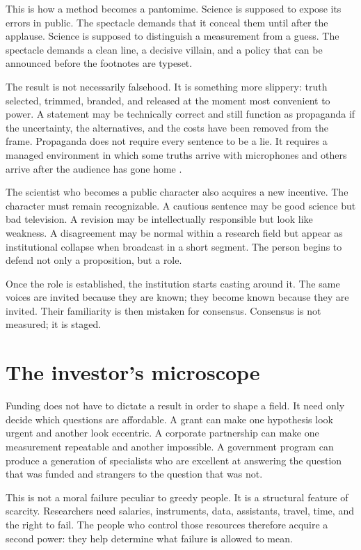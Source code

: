 ﻿\documentclass[12pt,a4paper]{book}
\begin{document}
This is how a method becomes a pantomime. Science is supposed to expose its
errors in public. The spectacle demands that it conceal them until after the
applause. Science is supposed to distinguish a measurement from a guess. The
spectacle demands a clean line, a decisive villain, and a policy that can be
announced before the footnotes are typeset.

The result is not necessarily falsehood. It is something more slippery:
truth selected, trimmed, branded, and released at the moment most convenient
to power. A statement may be technically correct and still function as
propaganda if the uncertainty, the alternatives, and the costs have been
removed from the frame. Propaganda does not require every sentence to be a
lie. It requires a managed environment in which some truths arrive with
microphones and others arrive after the audience has gone home
\cite{bernais-propaganda}.

The scientist who becomes a public character also acquires a new incentive.
The character must remain recognizable. A cautious sentence may be good
science but bad television. A revision may be intellectually responsible but
look like weakness. A disagreement may be normal within a research field but
appear as institutional collapse when broadcast in a short segment. The
person begins to defend not only a proposition, but a role.

Once the role is established, the institution starts casting around it. The
same voices are invited because they are known; they become known because they
are invited. Their familiarity is then mistaken for consensus. Consensus is
not measured; it is staged.

\section{The investor's microscope}

Funding does not have to dictate a result in order to shape a field. It need
only decide which questions are affordable. A grant can make one hypothesis
look urgent and another look eccentric. A corporate partnership can make one
measurement repeatable and another impossible. A government program can
produce a generation of specialists who are excellent at answering the
question that was funded and strangers to the question that was not.

This is not a moral failure peculiar to greedy people. It is a structural
feature of scarcity. Researchers need salaries, instruments, data, assistants,
travel, time, and the right to fail. The people who control those resources
therefore acquire a second power: they help determine what failure is allowed
to mean.
\end{document}
